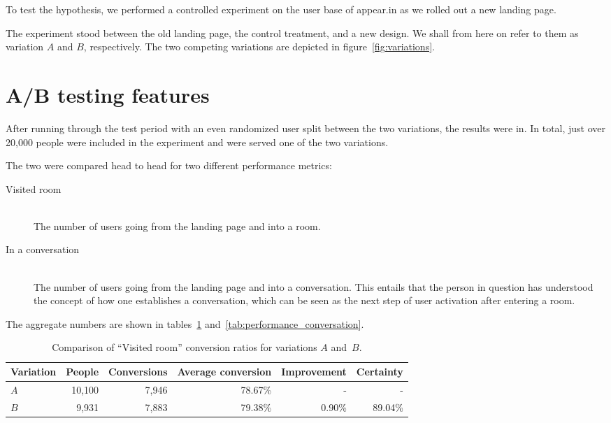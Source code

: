 To test the hypothesis, we performed a controlled experiment on the user base of appear.in as we rolled out a new landing page.

The experiment stood between the old landing page, the control treatment, and a new design. We shall from here on refer to them as variation $A$ and $B$, respectively. The two competing variations are depicted in figure~\ref{fig:variations}.

\section{A/B testing features}
\label{eval:sec:ab_testing_features}

After running through the test period with an even randomized user split between the two variations, the results were in. In total, just over 20,000 people were included in the experiment and were served one of the two variations.

The two were compared head to head for two different performance metrics:

\begin{description}
  \item[Visited room] \hfill \\
    The number of users going from the landing page and into a room.
  \item[In a conversation] \hfill \\
    The number of users going from the landing page and into a conversation. This entails that the person in question has understood the concept of how one establishes a conversation, which can be seen as the next step of user activation after entering a room.
\end{description}

The aggregate numbers are shown in tables~\ref{tab:performance_room} and~\ref{tab:performance_conversation}.

\begin{table}[h]
  \begin{tabular}{|l|r|r|r|r|r|}
    \hline
    Variation & People & Conversions & Average conversion & Improvement & Certainty \\ \hline
    $A$       & 10,100 & 7,946       & 78.67\%            & -           & -         \\ \hline
    $B$       &  9,931 & 7,883       & 79.38\%            & 0.90\%      & 89.04\%   \\ \hline
  \end{tabular}
  \caption{Comparison of ``Visited room'' conversion ratios for variations $A$ and~$B$.}
  \label{tab:performance_room}
\end{table}

